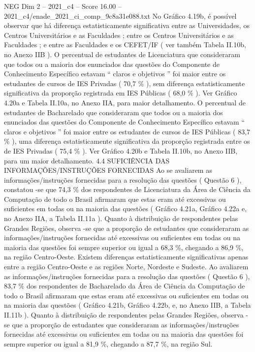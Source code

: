 \begin{textsample}{NEG Dim 2 – 2021\_c4 – Score 16.00 – 2021\_c4/enade\_2021\_ci\_comp\_9c8a31e088.txt}
No Gráfico 4.19b, é possível observar que há diferença estatisticamente significativa entre as Universidades, os Centros Universitários e as Faculdades ; entre os Centros Universitários e as Faculdades ; e entre as Faculdades e os CEFET/IF ( ver também Tabela II.10b, no Anexo IIB ).
O percentual de estudantes de Licenciatura que consideraram que todos ou a maioria dos enunciados das questões do Componente de Conhecimento Específico estavam “ claros e objetivos ” foi maior entre os estudantes de cursos de IES Privadas ( 70,7 \% ), sem diferença estatisticamente significativa da proporção registrada em IES Públicas ( 68,0 \% ).
Ver Gráfico 4.20a e Tabela II.10a, no Anexo IIA, para maior detalhamento.
O percentual de estudantes de Bacharelado que consideraram que todos ou a maioria dos enunciados das questões do Componente de Conhecimento Específico estavam “ claros e objetivos ” foi maior entre os estudantes de cursos de IES Públicas ( 83,7 \% ), uma diferença estatisticamente significativa da proporção registrada entre os de IES Privadas ( 75,4 \% ).
Ver Gráfico 4.20b e Tabela II.10b, no Anexo IIB, para um maior detalhamento. 4.4 SUFICIÊNCIA DAS INFORMAÇÕES/INSTRUÇÕES FORNECIDAS Ao se avaliarem as informações/instruções fornecidas para a resolução das questões ( Questão 6 ), constatou -se que 74,3 \% dos respondentes de Licenciatura da Área de Ciência da Computação de todo o Brasil afirmaram que estas eram até excessivas ou suficientes em todas ou na maioria das questões ( Gráfico 4.21a, Gráfico 4.22a e, no Anexo IIA, a Tabela II.11a ).
Quanto à distribuição de respondentes pelas Grandes Regiões, observa -se que a proporção de estudantes que consideraram as informações/instruções fornecidas até excessivas ou suficientes em todas ou na maioria das questões foi sempre superior ou igual a 68,3 \%, chegando a 86,9 \%, na região Centro-Oeste.
Existem diferenças estatisticamente significativas apenas entre a região Centro-Oeste e as regiões Norte, Nordeste e Sudeste.
Ao avaliarem as informações/instruções fornecidas para a resolução das questões ( Questão 6 ), 83,7 \% dos respondentes de Bacharelado da Área de Ciência da Computação de todo o Brasil afirmaram que estas eram até excessivas ou suficientes em todas ou na maioria das questões ( Gráfico 4.21b, Gráfico 4.22b, e, no Anexo IIB, a Tabela II.11b ).
Quanto à distribuição de respondentes pelas Grandes Regiões, observa -se que a proporção de estudantes que consideraram as informações/instruções fornecidas até excessivas ou suficientes em todas ou na maioria das questões foi sempre superior ou igual a 81,9 \%, chegando a 87,7 \%, na região Sul.

\end{textsample}
